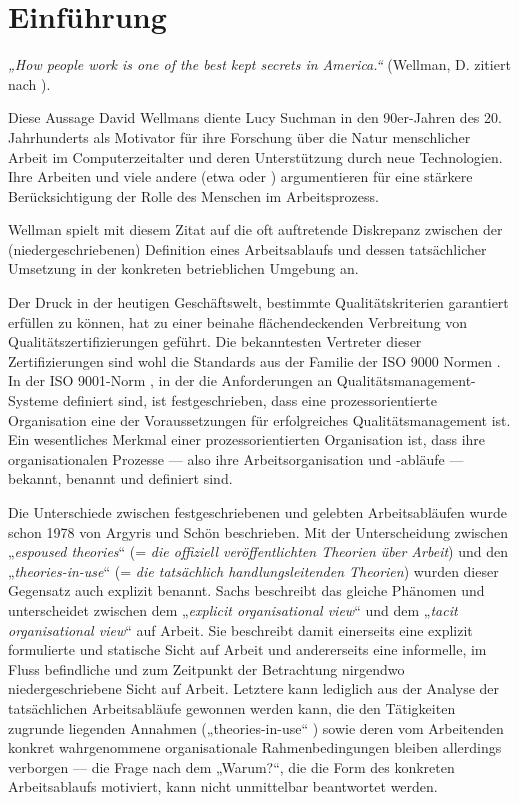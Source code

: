 \chapter{Einführung} %
\label{cha:einführung}

\emph{„How people work is one of the best kept secrets in America.“} (Wellman, D. zitiert nach \cite{Suchman95}).

Diese Aussage David Wellmans diente Lucy Suchman in den 90er-Jahren des 20. Jahrhunderts als Motivator für ihre Forschung über die Natur menschlicher Arbeit im Computerzeitalter und deren Unterstützung durch neue Technologien. Ihre Arbeiten und viele andere (etwa \cite{Schmidt92} oder \cite{Sachs95}) argumentieren für eine stärkere Berücksichtigung der Rolle des Menschen im Arbeitsprozess.

Wellman spielt mit diesem Zitat auf die oft auftretende Diskrepanz zwischen der (niedergeschriebenen) Definition eines Arbeitsablaufs und dessen tatsächlicher Umsetzung in der konkreten betrieblichen Umgebung an.

Der Druck in der heutigen Geschäftswelt, bestimmte Qualitätskriterien garantiert erfüllen zu können, hat zu einer beinahe flächendeckenden Verbreitung von Qualitätszertifizierungen geführt. Die bekanntesten Vertreter dieser Zertifizierungen sind wohl die Standards aus der Familie der ISO 9000 Normen \cite{ISO05}. In der ISO 9001-Norm \cite{ISO00}, in der die Anforderungen an Qualitätsmanagement-Systeme definiert sind, ist festgeschrieben, dass eine prozessorientierte Organisation eine der Voraussetzungen für erfolgreiches Qualitätsmanagement ist. Ein wesentliches Merkmal einer prozessorientierten Organisation ist, dass ihre organisationalen Prozesse — also ihre Arbeitsorganisation und -abläufe — bekannt, benannt und definiert sind. 

Die Unterschiede zwischen festgeschriebenen und gelebten Arbeitsabläufen wurde schon 1978 von Argyris und Schön \cite{Argyris78} beschrieben. Mit der Unterscheidung zwischen „\emph{espoused theories}“ (= \emph{die offiziell veröffentlichten Theorien über Arbeit}) und den „\emph{theories-in-use}“ (= \emph{die tatsächlich handlungsleitenden Theorien}) wurden dieser Gegensatz auch explizit benannt. Sachs \cite{Sachs95} beschreibt das gleiche Phänomen und unterscheidet zwischen dem „\emph{explicit organisational view}“ und dem „\emph{tacit organisational view}“ auf Arbeit. Sie beschreibt damit einerseits eine explizit formulierte und statische Sicht auf Arbeit und andererseits eine informelle, im Fluss befindliche und zum Zeitpunkt der Betrachtung nirgendwo niedergeschriebene Sicht auf Arbeit. Letztere kann lediglich aus der Analyse der tatsächlichen Arbeitsabläufe gewonnen werden kann, die den Tätigkeiten zugrunde liegenden Annahmen („theories-in-use“ \cite{Argyris78}) sowie deren vom Arbeitenden konkret wahrgenommene organisationale Rahmenbedingungen bleiben allerdings verborgen — die Frage nach dem „Warum?“, die die Form des konkreten Arbeitsablaufs motiviert, kann nicht unmittelbar beantwortet werden.

